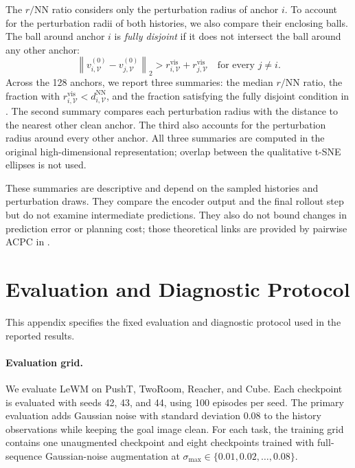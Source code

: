 \documentclass{article}
\newcommand{\stdmax}{\ensuremath{\sigma_{\max}}}
\begin{document}
The $r/\mathrm{NN}$ ratio considers only the perturbation radius of anchor
$i$. To account for the perturbation radii of both histories, we also compare
their enclosing balls. The ball around anchor $i$ is \emph{fully disjoint} if
it does not intersect the ball around any other anchor:
\begin{equation}
\left\|v_{i,\mathcal V}^{(0)}-v_{j,\mathcal V}^{(0)}\right\|_2
>
r_{i,\mathcal V}^{\mathrm{vis}}+r_{j,\mathcal V}^{\mathrm{vis}}
\quad\text{for every }j\neq i.
\label{eq:local-cloud-disjoint}
\end{equation}
Across the 128 anchors, we report three summaries: the median
$r/\mathrm{NN}$ ratio, the fraction with
$r_{i,\mathcal V}^{\mathrm{vis}}<d_{i,\mathcal V}^{\mathrm{NN}}$, and the
fraction satisfying the fully disjoint condition in
. The second summary compares each perturbation
radius with the distance to the nearest other clean anchor. The third also
accounts for the perturbation radius around every other anchor. All three
summaries are computed in the original high-dimensional representation;
overlap between the qualitative t-SNE ellipses is not used.

These summaries are descriptive and depend on the sampled histories and
perturbation draws. They compare the encoder output and the final rollout step
but do not examine intermediate predictions. They also do not bound changes
in prediction error or planning cost; those theoretical links are provided by
pairwise ACPC in .

\section{Evaluation and Diagnostic Protocol}\label{sec:appendix-A}

This appendix specifies the fixed evaluation and diagnostic protocol used in
the reported results.

\paragraph{Evaluation grid.}
We evaluate LeWM on PushT, TwoRoom, Reacher, and Cube. Each checkpoint is
evaluated with seeds 42, 43, and 44, using 100 episodes per seed. The primary
evaluation adds Gaussian noise with standard deviation $0.08$ to the history
observations while keeping the goal image clean. For each task, the training
grid contains one unaugmented checkpoint and eight checkpoints trained with
full-sequence Gaussian-noise augmentation at
$\stdmax{}\in\{0.01,0.02,\ldots,0.08\}$.
\end{document}
